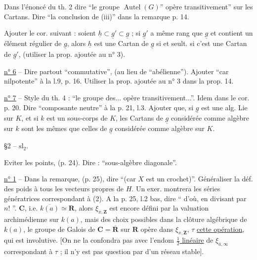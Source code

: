 Dans l'énoncé du th. 2 dire ``le groupe $\operatorname{Autel}(G)$'' opère transitivement'' sur les Cartans. Dire ``la conclusion de (iii)'' dans la remarque p. 14.

Ajouter le cor. suivant : soient $\underline{h}\subset\underline{g}'\subset\underline{g}$ ; si $\underline{g}'$ a même rang que $\underline{g}$ et contient un élément régulier de $\underline{g}$, alors $\underline{h}$ est une Cartan de $\underline{g}$ si et seult. si c'est une Cartan de $\underline{g}'$, (utiliser la prop. ajoutée au n° 3).

\uline{n° 6} -- Dire partout ``commutative'', (au lieu de ``abélienne''). Ajouter ``car nilpotente'' à la l.9, p. 16. Utiliser la prop. ajoutée au n° 3 dans la prop. 14.

\uline{n° 7} -- Style du th. 4 : ``le groupe des... opère transitivement...''. Idem dans le cor. p. 20. Dire ``composante neutre'' à la p. 21, l.3. Ajouter que, si $\underline{g}$ est une alg. Lie sur $K$, et si $k$ est un sous-corps de $K$, les Cartans de $\underline{g}$ considérée comme algèbre sur $k$ sont les mêmes que celles de $\underline{g}$ considérée comme algèbre sur $K$.

§2 --  $\mathrm{sl}_2$.

Eviter les points, (p. 24). Dire : ``sous-algèbre diagonale''.

\uline{n° 1} -- Dans la remarque, (p. 25), dire ``(car $X$ est un crochet)''. Généraliser la déf. des poids à tous les vecteurs propres de $H$. Un exer. montrera les séries génératrices correspondant à (2). A la p. 25, l.2 bas, dire `` d'où, en divisant par $n!$ ''.
$\mathbf C$, i.e. $\overline{k(a)}\simeq\mathbf R$,  alors $\xi_{x,\mathbf Z}$ est encore défini par la valuation archimédienne sur $k(a)$, mais   des choix possibles dans la clôture algébrique de $k(a)$, le groupe de Galois de $\mathbf C=\overline{\mathbf R}$ sur $\mathbf R$ opère dans $\xi_{x,\mathbf Z}$,  $\tau$ \uline{cette opération}, qui est involutive.  [On ne la confondra pas avec l'endom \uline{$\frac12$ linéaire} de $\xi_{\bar a,\infty}$ correspondant à $\tau$ ; il n'y est pas question par  d'un réseau stable].


